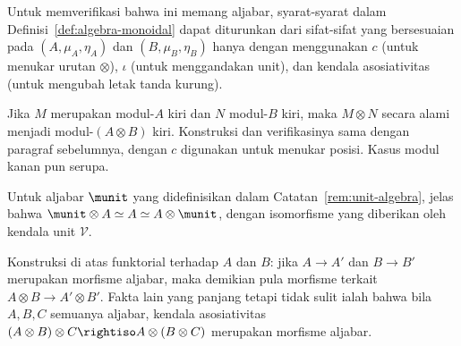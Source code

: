 Untuk memverifikasi bahwa ini memang aljabar, syarat-syarat dalam
Definisi~\ref{def:algebra-monoidal} dapat diturunkan dari sifat-sifat yang
bersesuaian pada $(A,\mu_A,\eta_A)$ dan $(B,\mu_B,\eta_B)$ hanya dengan
menggunakan $c$ (untuk menukar urutan $\otimes$), $\iota$ (untuk menggandakan
unit), dan kendala asosiativitas (untuk mengubah letak tanda kurung).

Jika $M$ merupakan modul-$A$ kiri dan $N$ modul-$B$ kiri, maka $M\otimes N$
secara alami menjadi modul-$(A\otimes B)$ kiri. Konstruksi dan verifikasinya
sama dengan paragraf sebelumnya, dengan $c$ digunakan untuk menukar posisi.
Kasus modul kanan pun serupa.

Untuk aljabar $\munit$ yang didefinisikan dalam
Catatan~\ref{rem:unit-algebra}, jelas bahwa
$\munit\otimes A\simeq A\simeq A\otimes\munit$, dengan isomorfisme yang
diberikan oleh kendala unit $\mathcal{V}$.

\begin{catatan}\label{rem:Alg-otimes-functorial}
	Konstruksi di atas funktorial terhadap $A$ dan $B$: jika $A\to A'$ dan
	$B\to B'$ merupakan morfisme aljabar, maka demikian pula morfisme terkait
	$A\otimes B\to A'\otimes B'$. Fakta lain yang panjang tetapi tidak sulit
	ialah bahwa bila $A,B,C$ semuanya aljabar, kendala asosiativitas
	$(A\otimes B)\otimes C\rightiso A\otimes(B\otimes C)$ merupakan morfisme
	aljabar.
\end{catatan}

